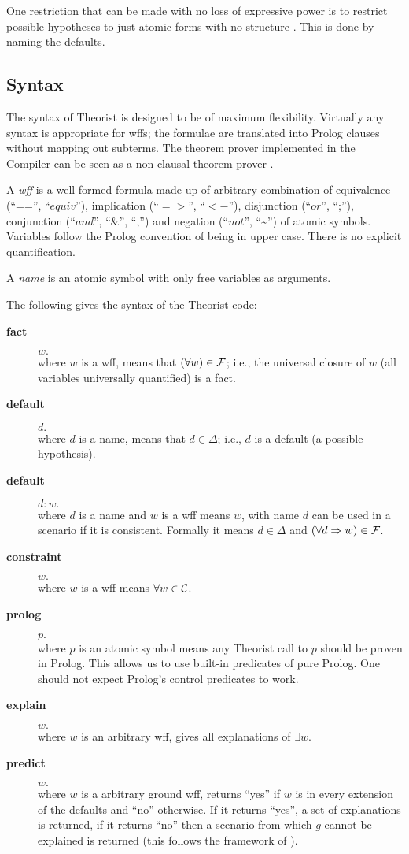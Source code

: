 One restriction that can be made with no loss of expressive power
is to restrict possible hypotheses to just atomic forms with no
structure \cite{poole:lf}. This is done by naming the defaults.
\subsection{Syntax} \label{syntax}
The syntax of Theorist is designed to be of maximum flexibility.
Virtually any syntax is appropriate for wffs; the formulae are translated
into Prolog clauses without mapping out subterms. The theorem
prover implemented in the Compiler can be seen as a non-clausal theorem
prover \cite{poole:clausal}.

A {\em wff\/} is a well formed formula made up of arbitrary combination of
equivalence (``=='', ``$equiv$''),
implication (``$=>$'', ``$<-$''), disjunction (``$or$'', ``;''),
conjunction (``$and$'', ``$\&$'', ``,'') and negation (``$not$'', ``\~{}'')
of atomic symbols. Variables follow the Prolog convention
of being in upper case. There is no explicit quantification.

A {\em name\/} is an atomic symbol with only free variables as arguments.

The following gives the syntax of the Theorist code:
\begin{description}
\item[\bf fact]
$w.$\\
where $w$ is a wff,
means that $(\forall w) \in {\cal F}$; i.e., the universal closure of $w$ (all
variables universally quantified) is a fact.
\item[\bf default]
$d.$\\
where $d$ is a name,
means that $d\in \Delta$; i.e., $d$ is a default (a possible hypothesis).
\item[\bf default]
$d:w.$\\
where $d$ is a name and $w$ is a wff means $w$, with name $d$ can
be used in a scenario if it is consistent.
Formally it means $d\in  \Delta$ and
$(\forall d\Rightarrow w) \in {\cal F}$.
\item[\bf constraint]
$w.$\\
where $w$ is a wff means $\forall w\in \cal C$.
\item[\bf prolog]
$p.$\\
where $p$ is an atomic symbol means any Theorist call to $p$ should
be proven in Prolog. This allows us to use built-in predicates of pure Prolog.
One should not expect Prolog's control predicates to work.
\item[\bf explain]
$w.$\\
where $w$ is an arbitrary wff,
gives all explanations of $\exists w$.
\item[\bf predict]
$w.$\\
where $w$ is a arbitrary ground wff,
returns ``yes'' if $w$ is in every extension of the defaults
and ``no'' otherwise.
If it returns ``yes'', a set of explanations is returned, if
it returns ``no'' then a scenario from which $g$ cannot be explained is
returned (this follows the framework of \cite{poole:dc}).

\end{description}

